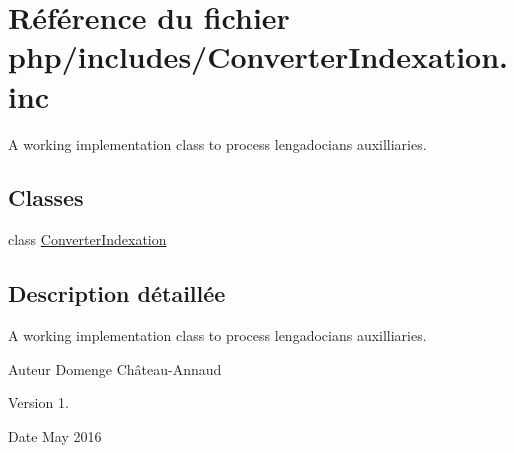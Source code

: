 \hypertarget{_converter_indexation_8inc}{}\section{Référence du fichier php/includes/\+Converter\+Indexation.inc}
\label{_converter_indexation_8inc}


A working implementation class to process lengadocians auxilliaries.  


\subsection*{Classes}
\begin{DoxyCompactItemize}
\item 
class \hyperlink{class_converter_indexation}{Converter\+Indexation}
\end{DoxyCompactItemize}


\subsection{Description détaillée}
A working implementation class to process lengadocians auxilliaries. 

\begin{DoxyAuthor}{Auteur}
Domenge Château-\/\+Annaud 
\end{DoxyAuthor}
\begin{DoxyVersion}{Version}
1. 
\end{DoxyVersion}
\begin{DoxyDate}{Date}
May 2016 
\end{DoxyDate}
